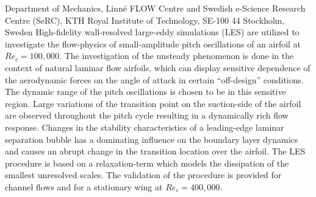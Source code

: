 %
%
%
%
%
%
%
\paperaffiliation
{%
Department of Mechanics, Linn\'e FLOW Centre and Swedish e-Science Research Centre (SeRC), KTH Royal Institute of Technology, SE-100 44 Stockholm, Sweden 
}%
%
%
%
%
\papersummary%
{%
	High-fidelity wall-resolved large-eddy simulations (LES) are utilized to investigate the flow-physics of small-amplitude pitch oscillations of an airfoil at $Re_{c}=100,000$. The investigation of the unsteady phenomenon is done in the context of natural laminar flow airfoils, which can display sensitive dependence of the aerodynamic forces on the angle of attack in certain ``off-design'' conditions. The dynamic range of the pitch oscillations is chosen to be in this sensitive region. Large variations of the transition point on the suction-side of the airfoil are observed throughout the pitch cycle resulting in a dynamically rich flow response. Changes in the stability characteristics of a leading-edge laminar separation bubble has a dominating influence on the boundary layer dynamics and causes an abrupt change in the transition location over the airfoil. The LES procedure is based on a relaxation-term which models the dissipation of the smallest unresolved scales. The validation of the procedure is provided for channel flows and for a stationary wing at $Re_{c}=400,000$.
}%
